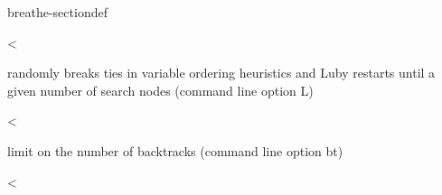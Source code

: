 \documentclass[letterpaper,10pt,openany,oneside,english]{sphinxmanual}
\begin{document}
\begin{fulllineitems}
\begin{sphinxuseclass}{breathe-sectiondef}

\begin{fulllineitems}
\label{\detokenize{ref/ref_cpp:_CPPv4N8ToulBar214backtrackLimitE}}\label{\detokenize{ref/ref_cpp:_CPPv3N8ToulBar214backtrackLimitE}}\label{\detokenize{ref/ref_cpp:_CPPv2N8ToulBar214backtrackLimitE}}\label{\detokenize{ref/ref_cpp:ToulBar2::backtrackLimit__Long}}
\pysigstartsignatures
\pysigstartmultiline
{}
\pysigstopmultiline
\pysigstopsignatures
\sphinxAtStartPar
\textless{} 

\sphinxAtStartPar
randomly breaks ties in variable ordering heuristics and Luby restarts until a given number of search nodes (command line option \sphinxhyphen{}L) 

\end{fulllineitems}


\begin{fulllineitems}
\label{\detokenize{ref/ref_cpp:_CPPv4N8ToulBar28setvalueE}}\label{\detokenize{ref/ref_cpp:_CPPv3N8ToulBar28setvalueE}}\label{\detokenize{ref/ref_cpp:_CPPv2N8ToulBar28setvalueE}}\label{\detokenize{ref/ref_cpp:ToulBar2::setvalue__externalevent}}
\pysigstartsignatures
\pysigstartmultiline
{}
\pysigstopmultiline
\pysigstopsignatures
\sphinxAtStartPar
\textless{} 

\sphinxAtStartPar
limit on the number of backtracks (command line option \sphinxhyphen{}bt) 

\end{fulllineitems}


\begin{fulllineitems}
\label{\detokenize{ref/ref_cpp:_CPPv4N8ToulBar26setminE}}\label{\detokenize{ref/ref_cpp:_CPPv3N8ToulBar26setminE}}\label{\detokenize{ref/ref_cpp:_CPPv2N8ToulBar26setminE}}\label{\detokenize{ref/ref_cpp:ToulBar2::setmin__externalevent}}
\pysigstartsignatures
\pysigstartmultiline
{}
\pysigstopmultiline
\pysigstopsignatures
\sphinxAtStartPar
\textless{} 


\end{fulllineitems}
\end{sphinxuseclass}
\end{fulllineitems}
\end{document}
